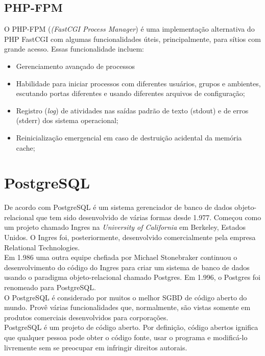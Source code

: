 \subsection{PHP-FPM}
O PHP-FPM (\textit{(FastCGI Process Manager}) é uma implementação alternativa do PHP FastCGI com algumas funcionalidades úteis, principalmente, para sítios com grande acesso. Essas funcionalidade incluem:
\begin{itemize}
	\item Gerenciamento avançado de processos
	\item Habilidade para iniciar processos com diferentes usuários, grupos e ambientes, escutando portas diferentes e usando diferentes arquivos de configuração;
	\item Registro (\textit{log}) de atividades nas saídas padrão de texto (stdout) e de erros (stderr) dos sistema operacional;
	\item Reinicialização emergencial em caso de destruição acidental da memória cache;
\end{itemize}
\section{PostgreSQL}
De acordo com  PostgreSQL é um sistema gerenciador de banco de dados objeto-relacional que tem sido desenvolvido de várias formas desde 1.977. Começou como um projeto chamado Ingres na \textit{University of California} em Berkeley, Estados Unidos. O Ingres foi, posteriormente, desenvolvido comercialmente pela empresa Relational Technologies.\\
Em 1.986 uma outra equipe chefiada por Michael Stonebraker continuou o desenvolvimento do código do Ingres para criar um sistema de banco de dados usando o paradigma objeto-relacional chamado Postgres. Em 1.996, o Postgres foi renomeado para PostgreSQL.\\
O PostgreSQL é considerado por muitos o melhor SGBD de código aberto do mundo. Provê várias funcionalidades que, normalmente, são vistas somente em produtos comerciais desenvolvidos para corporações.\\
PostgreSQL é um projeto de código aberto. Por definição, código abertos ignifica que qualquer pessoa pode obter o código fonte, usar o programa e modificá-lo livremente sem se preocupar em infringir direitos autorais.
